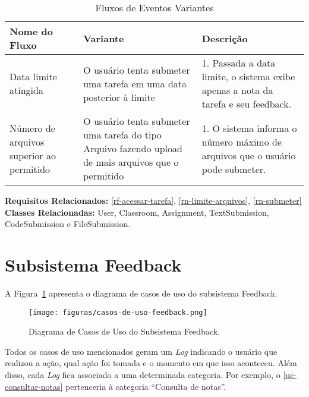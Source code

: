 \begin{table}[H]
	\centering \vspace{0.5cm} \footnotesize
	\caption{Fluxos de Eventos Variantes}
	\begin{tabular}{|p{2.3cm}|p{2.5cm}|p{10cm}|} \hline  \rowcolor[rgb]{0.8,0.8,0.8}
		
		Nome do Fluxo & Variante & Descrição  \\ \hline		
		
		Data limite atingida & O usuário tenta submeter uma tarefa em uma data posterior à limite & 1. Passada a data limite, o sistema exibe apenas a nota da tarefa e seu feedback.  \\ \hline 
		
		Número de arquivos superior ao permitido & O usuário tenta submeter uma tarefa do tipo Arquivo fazendo upload de mais arquivos que o permitido & 1. O sistema informa o número máximo de arquivos que o usuário pode submeter.  \\ \hline 
		
	\end{tabular}
\end{table}


\noindent  \textbf{Requisitos Relacionados:} \ref{rf-acessar-tarefa}, \ref{rn-limite-arquivos}, \ref{rn-submeter}       \\ \textbf{Classes Relacionadas:} User, Classroom, Assignment, TextSubmission, CodeSubmission e FileSubmission.

\newpage


\section{Subsistema Feedback}

A Figura~\ref{figura-caso-de-uso-feedback} apresenta o diagrama de casos de uso do subsistema Feedback.

\begin{figure}[h!]
	\centering
	\texttt{[image: figuras/casos-de-uso-feedback.png]}
	\caption{Diagrama de Casos de Uso do Subsistema Feedback.}
	\label{figura-caso-de-uso-feedback}
\end{figure}

Todos os casos de uso mencionados geram um \textit{Log} indicando o usuário que realizou a ação, qual ação foi tomada e o momento em que isso aconteceu. Além disso, cada \textit{Log} fica associado a uma determinada categoria. Por exemplo, o \ref{uc-consultar-notas} pertenceria à categoria ``Consulta de notas''.

